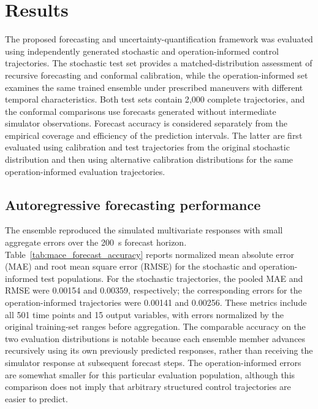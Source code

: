 \section{Results}
\label{sec:results}

The proposed forecasting and uncertainty-quantification framework was evaluated using independently generated stochastic and operation-informed control trajectories. The stochastic test set provides a matched-distribution assessment of recursive forecasting and conformal calibration, while the operation-informed set examines the same trained ensemble under prescribed maneuvers with different temporal characteristics. Both test sets contain 2{,}000 complete trajectories, and the conformal comparisons use forecasts generated without intermediate simulator observations. Forecast accuracy is considered separately from the empirical coverage and efficiency of the prediction intervals. The latter are first evaluated using calibration and test trajectories from the original stochastic distribution and then using alternative calibration distributions for the same operation-informed evaluation trajectories.

\subsection{Autoregressive forecasting performance}
\label{sec:results:forecasting}

The ensemble reproduced the simulated multivariate responses with small aggregate errors over the 200~s forecast horizon. Table~\ref{tab:mace_forecast_accuracy} reports normalized mean absolute error (MAE) and root mean square error (RMSE) for the stochastic and operation-informed test populations. For the stochastic trajectories, the pooled MAE and RMSE were 0.00154 and 0.00359, respectively; the corresponding errors for the operation-informed trajectories were 0.00141 and 0.00256. These metrics include all 501 time points and 15 output variables, with errors normalized by the original training-set ranges before aggregation. The comparable accuracy on the two evaluation distributions is notable because each ensemble member advances recursively using its own previously predicted responses, rather than receiving the simulator response at subsequent forecast steps. The operation-informed errors are somewhat smaller for this particular evaluation population, although this comparison does not imply that arbitrary structured control trajectories are easier to predict.

